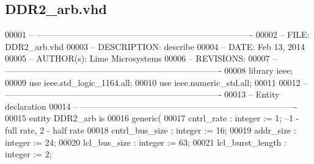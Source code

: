 \subsection{D\+D\+R2\+\_\+arb.\+vhd}
\label{DDR2__arb_8vhd_source}

\begin{DoxyCode}
00001 \textcolor{keyword}{-- ---------------------------------------------------------------------------- }
00002 \textcolor{keyword}{-- FILE:    DDR2\_arb.vhd}
00003 \textcolor{keyword}{-- DESCRIPTION: describe}
00004 \textcolor{keyword}{-- DATE:    Feb 13, 2014}
00005 \textcolor{keyword}{-- AUTHOR(s):   Lime Microsystems}
00006 \textcolor{keyword}{-- REVISIONS:}
00007 \textcolor{keyword}{-- ---------------------------------------------------------------------------- }
00008 \textcolor{vhdlkeyword}{library }\textcolor{keywordflow}{ieee};
00009 \textcolor{vhdlkeyword}{use }ieee.std\_logic\_1164.\textcolor{keywordflow}{all};
00010 \textcolor{vhdlkeyword}{use }ieee.numeric\_std.\textcolor{keywordflow}{all};
00011 
00012 \textcolor{keyword}{-- ----------------------------------------------------------------------------}
00013 \textcolor{keyword}{-- Entity declaration}
00014 \textcolor{keyword}{-- ----------------------------------------------------------------------------}
00015 \textcolor{keywordflow}{entity }DDR2_arb \textcolor{keywordflow}{is}
00016     \textcolor{keywordflow}{generic}\textcolor{vhdlchar}{(}
00017         \textcolor{vhdlchar}{cntrl_rate}          \textcolor{vhdlchar}{:} \textcolor{comment}{integer} \textcolor{vhdlchar}{:=} \textcolor{vhdllogic}{}\textcolor{vhdllogic}{1};\textcolor{keyword}{ --1 - full rate, 2 - half rate}
00018         \textcolor{vhdlchar}{cntrl_bus_size}      \textcolor{vhdlchar}{:} \textcolor{comment}{integer} \textcolor{vhdlchar}{:=} \textcolor{vhdllogic}{}\textcolor{vhdllogic}{16};
00019         \textcolor{vhdlchar}{addr_size}           \textcolor{vhdlchar}{:} \textcolor{comment}{integer} \textcolor{vhdlchar}{:=} \textcolor{vhdllogic}{}\textcolor{vhdllogic}{24};
00020         \textcolor{vhdlchar}{lcl_bus_size}        \textcolor{vhdlchar}{:} \textcolor{comment}{integer} \textcolor{vhdlchar}{:=} \textcolor{vhdllogic}{}\textcolor{vhdllogic}{63};
00021         \textcolor{vhdlchar}{lcl_burst_length}    \textcolor{vhdlchar}{:} \textcolor{comment}{integer} \textcolor{vhdlchar}{:=} \textcolor{vhdllogic}{}\textcolor{vhdllogic}{2};

\end{DoxyCode}
